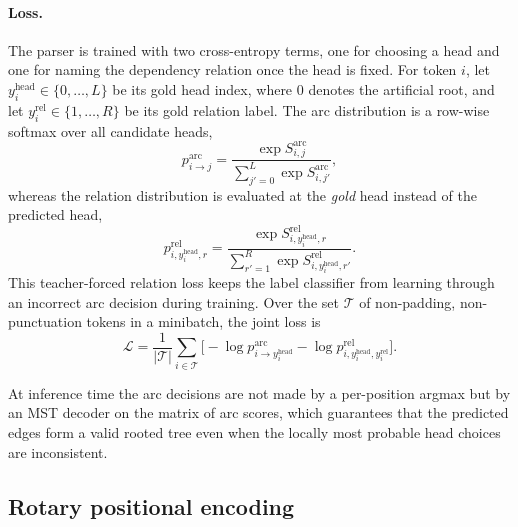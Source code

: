 \paragraph{Loss.} The parser is trained with two cross-entropy terms, one for choosing a head and one for naming the dependency relation once the head is fixed. For token $i$, let $y^{\text{head}}_i \in \{0,\ldots,L\}$ be its gold head index, where $0$ denotes the artificial root, and let $y^{\text{rel}}_i \in \{1,\ldots,R\}$ be its gold relation label. The arc distribution is a row-wise softmax over all candidate heads,
\[
p^{\text{arc}}_{i\rightarrow j}
=
\frac{\exp S^{\text{arc}}_{i,j}}{\sum_{j'=0}^{L}\exp S^{\text{arc}}_{i,j'}} ,
\]
whereas the relation distribution is evaluated at the \emph{gold} head instead of the predicted head,
\[
p^{\text{rel}}_{i,y^{\text{head}}_i,r}
=
\frac{\exp S^{\text{rel}}_{i,y^{\text{head}}_i,r}}{\sum_{r'=1}^{R}\exp S^{\text{rel}}_{i,y^{\text{head}}_i,r'}} .
\]
This teacher-forced relation loss keeps the label classifier from learning through an incorrect arc decision during training. Over the set $\mathcal{T}$ of non-padding, non-punctuation tokens in a minibatch, the joint loss is
\begin{equation}
\label{eq:loss}
\mathcal{L} = \frac{1}{|\mathcal{T}|} \sum_{i\in\mathcal{T}} \Big[ -\log p^{\text{arc}}_{i \rightarrow y^{\text{head}}_i} - \log p^{\text{rel}}_{i, y^{\text{head}}_i, y^{\text{rel}}_i} \Big].
\end{equation}

At inference time the arc decisions are not made by a per-position argmax but by an MST decoder on the matrix of arc scores, which guarantees that the predicted edges form a valid rooted tree even when the locally most probable head choices are inconsistent.

\subsection{Rotary positional encoding}

